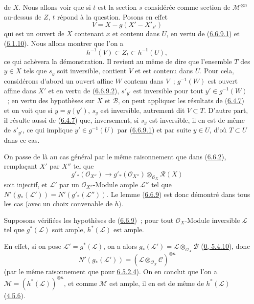 
de $X$. Nous allons voir que si $t$ est la section $s$ considérée comme
section de $\mathcal{M}^{\otimes n}$ au-dessus de $Z$, $t$ répond à la
question. Posons en effet
\[
\label{II.6.6.9.2-fr}
V=X-g(X'-X'_{s'})
\tag{6.6.9.2}
\]
qui est un ouvert de $X$ contenant $x$ et contenu dans $U$, en vertu de
(\hyperref[II.6.6.9.1-fr]{6.6.9.1}) et
(\hyperref[II.6.1.10-fr]{6.1.10}). Nous allons montrer que l'on a
\[
\label{II.6.6.9.3-fr}
h^{-1}(V)\subset Z_t\subset h^{-1}(U),
\tag{6.6.9.3}
\]
ce qui achèvera la démonstration. Il revient au même de dire que l'ensemble
$T$ des $y\in X$ tels que $s_y$ soit inversible, contient $V$ et est contenu
dans $U$. Pour cela, considérons d'abord un ouvert affine $W$ contenu dans
$V$~; $g^{-1}(W)$ est ouvert affine dans $X'$ et en vertu de
(\hyperref[II.6.6.9.2-fr]{6.6.9.2}), $s'_{y'}$ est inversible pour tout
$y'\in g^{-1}(W)$~; en vertu des hypothèses sur $X$ et $\mathcal{B}$, on
peut appliquer les résultats de (\hyperref[II.6.4.7-fr]{6.4.7}) et on voit
que si $y=g(y')$, $s_y$ est inversible, autrement dit $V\subset T$. D'autre
part, il résulte aussi de (\hyperref[II.6.4.7-fr]{6.4.7}) que, inversement,
si $s_y$ est inversible, il en est de même de $s'_{y'}$, ce qui implique
$y'\in g^{-1}(U)$ par (\hyperref[II.6.6.9.1-fr]{6.6.9.1}) et par suite
$y\in U$, d'où $T\subset U$ dans ce cas.

On passe de là au cas général par le même raisonnement que dans
(\hyperref[II.6.6.2-fr]{6.6.2}), remplaçant $X'$ par $X''$ tel que
\[
g'_*(\mathcal{O}_{X''})\longrightarrow
g'_*(\mathcal{O}_{X''})\otimes_{\mathcal{O}_X}\mathcal{R}(X)
\]
soit injectif, et $\mathcal{L}'$ par un $\mathcal{O}_{X''}$-Module ample
$\mathcal{L}''$ tel que
$N'(g_*(\mathcal{L}'))=N'(g'_*(\mathcal{L}''))$. Le lemme
(\hyperref[II.6.6.9-fr]{6.6.9}) est donc démontré dans tous les cas (avec un
choix convenable de $h$).

\begin{corollary}[6.6.10]
\label{II.6.6.10-fr}
Supposons vérifiées les hypothèses de
(\hyperref[II.6.6.9-fr]{6.6.9})~; pour tout $\mathcal{O}_X$-Module inversible
$\mathcal{L}$ tel que $g^*(\mathcal{L})$ soit ample, $h^*(\mathcal{L})$ est
ample.
\end{corollary}

En effet, si on pose $\mathcal{L}'=g^*(\mathcal{L})$, on a alors
$g_*(\mathcal{L}')=\mathcal{L}\otimes_{\mathcal{O}_X}\mathcal{B}$
(\hyperref[0.5.4.10-fr]{0, 5.4.10}), donc
\[
N'(g_*(\mathcal{L}'))=
(\mathcal{L}\otimes_{\mathcal{O}_X}\mathcal{C})^{\otimes n}
\]
(par le même raisonnement que pour
\hyperref[II.6.5.2.4-fr]{6.5.2.4}). On en conclut que l'on a
$\mathcal{M}=(h^*(\mathcal{L}))^{\otimes n}$, et comme $\mathcal{M}$ est
ample, il en est de même de $h^*(\mathcal{L})$
(\hyperref[II.4.5.6-fr]{4.5.6}).

